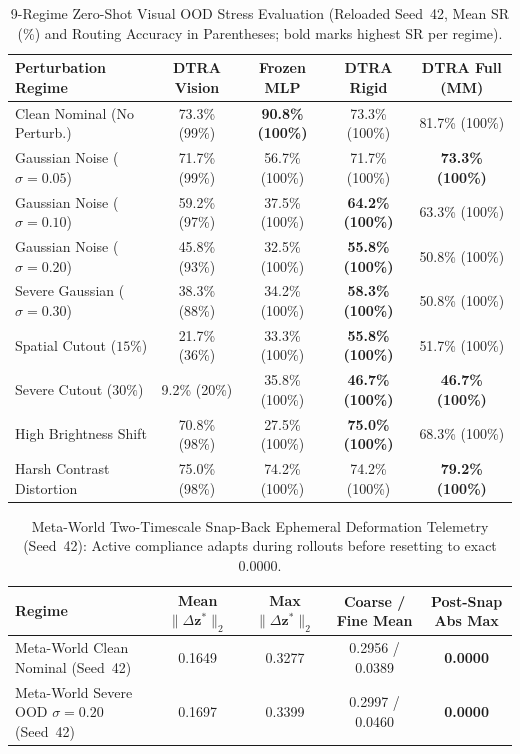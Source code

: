 \documentclass[10pt]{article}
\newcommand{\tblfont}{\fontsize{8.5pt}{10.4pt}\selectfont}
\begin{document}
\begin{table}[ht!]
  \centering
  \caption{9-Regime Zero-Shot Visual OOD Stress Evaluation (Reloaded Seed~42, Mean SR (\%) and Routing Accuracy in Parentheses; bold marks highest SR per regime).}
  \label{tab:mw_ood9}
  \tblfont
  \setlength{\tabcolsep}{2.8pt}
  \begin{tabular}{lcccc}
    \toprule
    \textbf{Perturbation Regime} & \textbf{DTRA Vision} & \textbf{Frozen MLP} & \textbf{DTRA Rigid} & \textbf{DTRA Full (MM)} \\
    \midrule
    Clean Nominal (No Perturb.) & 73.3\% (99\%) & \textbf{90.8\% (100\%)} & 73.3\% (100\%) & 81.7\% (100\%) \\
    Gaussian Noise ($\sigma=0.05$) & 71.7\% (99\%) & 56.7\% (100\%) & 71.7\% (100\%) & \textbf{73.3\% (100\%)} \\
    Gaussian Noise ($\sigma=0.10$) & 59.2\% (97\%) & 37.5\% (100\%) & \textbf{64.2\% (100\%)} & 63.3\% (100\%) \\
    Gaussian Noise ($\sigma=0.20$) & 45.8\% (93\%) & 32.5\% (100\%) & \textbf{55.8\% (100\%)} & 50.8\% (100\%) \\
    Severe Gaussian ($\sigma=0.30$) & 38.3\% (88\%) & 34.2\% (100\%) & \textbf{58.3\% (100\%)} & 50.8\% (100\%) \\
    Spatial Cutout ($15\%$) & 21.7\% (36\%) & 33.3\% (100\%) & \textbf{55.8\% (100\%)} & 51.7\% (100\%) \\
    Severe Cutout ($30\%$) & 9.2\% (20\%) & 35.8\% (100\%) & \textbf{46.7\% (100\%)} & \textbf{46.7\% (100\%)} \\
    High Brightness Shift & 70.8\% (98\%) & 27.5\% (100\%) & \textbf{75.0\% (100\%)} & 68.3\% (100\%) \\
    Harsh Contrast Distortion & 75.0\% (98\%) & 74.2\% (100\%) & 74.2\% (100\%) & \textbf{79.2\% (100\%)} \\
    \bottomrule
  \end{tabular}
\end{table}

\begin{table}[ht!]
  \centering
  \caption{Meta-World Two-Timescale Snap-Back Ephemeral Deformation Telemetry (Seed~42): Active compliance adapts during rollouts before resetting to exact $0.0000$.}
  \label{tab:mw_snapback}
  \tblfont
  \setlength{\tabcolsep}{4.2pt}
  \begin{tabular}{lcccc}
    \toprule
    \textbf{Regime} & \textbf{Mean $\|\Delta\mathbf{z}^*\|_2$} & \textbf{Max $\|\Delta\mathbf{z}^*\|_2$} & \textbf{Coarse / Fine Mean} & \textbf{Post-Snap Abs Max} \\
    \midrule
    Meta-World Clean Nominal (Seed~42) & 0.1649 & 0.3277 & 0.2956 / 0.0389 & \textbf{0.0000} \\
    Meta-World Severe OOD $\sigma=0.20$ (Seed~42) & 0.1697 & 0.3399 & 0.2997 / 0.0460 & \textbf{0.0000} \\
    \bottomrule
  \end{tabular}
\end{table}
\end{document}
